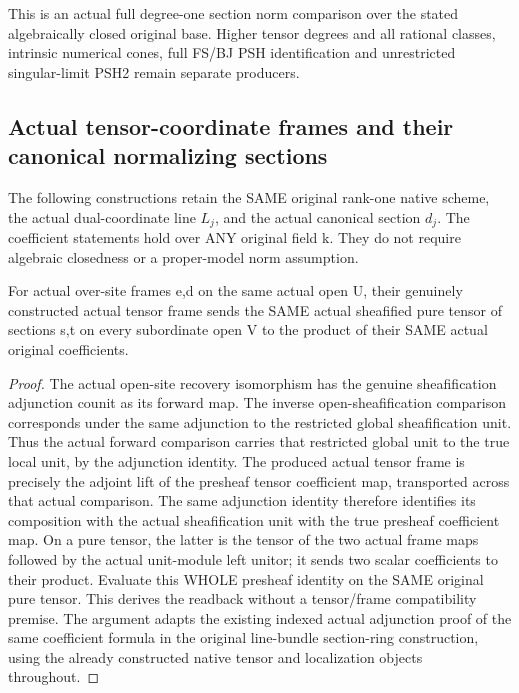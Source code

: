 \begin{remark}
This is an actual full degree-one section norm comparison over the stated
algebraically closed original base. Higher tensor degrees and all rational
classes, intrinsic numerical cones, full FS/BJ PSH identification and
unrestricted singular-limit PSH2 remain separate producers.
\end{remark}

\subsection{Actual tensor-coordinate frames and their canonical normalizing sections}
The following constructions retain the SAME original rank-one native
scheme, the actual dual-coordinate line $L_j$, and the actual canonical
section $d_j$. The coefficient statements hold over ANY original field k.
They do not require algebraic closedness or a proper-model norm assumption.

\begin{lemma}
\label{lem:seven-native-actual-tensor-frame-coefficients}
\leanok
For actual over-site frames e,d on the same actual open U, their genuinely
constructed actual tensor frame sends the SAME actual sheafified pure tensor
of sections s,t on every subordinate open V to the product of their SAME
actual original coefficients.
\end{lemma}
\begin{proof}
The actual open-site recovery isomorphism has the genuine sheafification
adjunction counit as its forward map. The inverse open-sheafification
comparison corresponds under the same adjunction to the restricted global
sheafification unit. Thus the actual forward comparison carries that
restricted global unit to the true local unit, by the adjunction identity.
The produced actual tensor frame is precisely the adjoint lift of the
presheaf tensor coefficient map, transported across that actual comparison.
The same adjunction identity therefore identifies its composition with the
actual sheafification unit with the true presheaf coefficient map. On a
pure tensor, the latter is the tensor of the two actual frame maps followed
by the actual unit-module left unitor; it sends two scalar coefficients to
their product. Evaluate this WHOLE presheaf identity on the SAME original
pure tensor. This derives the readback without a tensor/frame compatibility
premise. The argument adapts the existing indexed actual adjunction proof
of the same coefficient formula in the original line-bundle section-ring
construction, using the already constructed native tensor and localization
objects throughout.
\end{proof}

